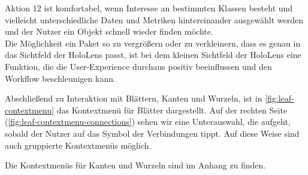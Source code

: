 \noindent Aktion 12 ist komfortabel, wenn Interesse an bestimmten Klassen besteht und vielleicht unterschiedliche Daten und Metriken hintereinander ausgewählt werden und der Nutzer ein Objekt schnell wieder finden möchte.\\

\noindent Die Möglichkeit ein Paket so zu vergrößern oder zu verkleinern, dass es genau in das Sichtfeld der HoloLens passt, ist bei dem kleinen Sichtfeld der HoloLens eine Funktion, die die User-Experience durchaus positiv beeinflussen und den Workflow beschleunigen kann.\\

\endgroup

Abschließend zu Interaktion mit Blättern, Kanten und Wurzeln, ist in \ref{fig:leaf-contextmenu} das Kontextmenü für  Blätter dargestellt. Auf der rechten Seite (\ref{fig:leaf-contextmenu-connections}) sehen wir eine Unterauswahl, die aufgeht, sobald der Nutzer auf das Symbol der Verbindungen tippt. Auf diese Weise sind auch gruppierte Kontextmenüs möglich.

Die Kontextmenüs für Kanten und Wurzeln sind im Anhang zu finden.

